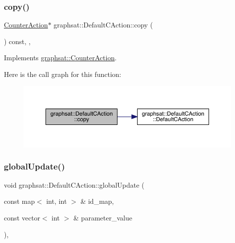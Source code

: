 \subsubsection{\texorpdfstring{copy()}{copy()}}
{\footnotesize\ttfamily \mbox{\hyperlink{classgraphsat_1_1_counter_action}{Counter\+Action}}$\ast$ graphsat\+::\+Default\+C\+Action\+::copy (\begin{DoxyParamCaption}{ }\end{DoxyParamCaption}) const\hspace{0.3cm}{\ttfamily [inline]}, {\ttfamily [private]}, {\ttfamily [virtual]}}



Implements \mbox{\hyperlink{classgraphsat_1_1_counter_action_aa6ab6ebd8e13b466dba062efea962691}{graphsat\+::\+Counter\+Action}}.

Here is the call graph for this function\+:
\nopagebreak
\begin{figure}[H]
\begin{center}
\leavevmode
\includegraphics[width=350pt]{classgraphsat_1_1_default_c_action_a69fa305cacc678c4435bad7a101302aa_cgraph}
\end{center}
\end{figure}
\mbox{\label{classgraphsat_1_1_default_c_action_a70f9da2bbdd46e42d279b867195daa56}} 
\subsubsection{\texorpdfstring{globalUpdate()}{globalUpdate()}}
{\footnotesize\ttfamily void graphsat\+::\+Default\+C\+Action\+::global\+Update (\begin{DoxyParamCaption}\item[{const map$<$ int, int $>$ \&}]{id\+\_\+map,  }\item[{const vector$<$ int $>$ \&}]{parameter\+\_\+value }\end{DoxyParamCaption})\hspace{0.3cm}{\ttfamily [inline]}, {\ttfamily [virtual]}}

